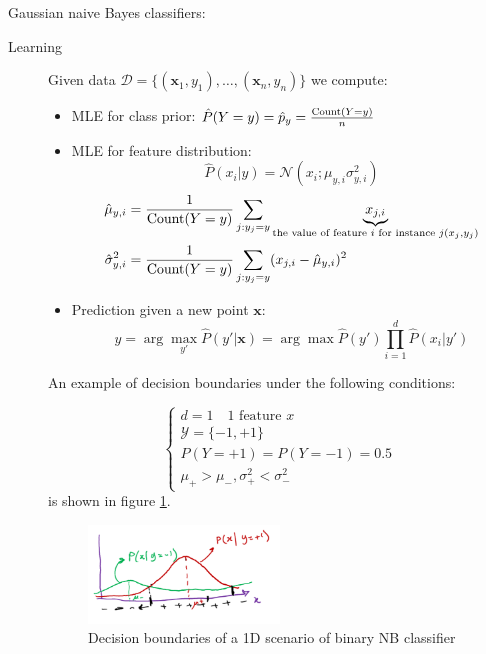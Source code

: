 \documentclass[a4paper,10pt,twoside]{article}
\begin{document}
Gaussian naive Bayes classifiers:
\begin{description}
\item[Learning] Given data $\mathcal{D}=\{(\mathbf{x}_1,y_1),\ldots,(\mathbf{x}_n,y_n)\}$ we compute:
\begin{itemize}
\item MLE for class prior: $\hat{P}(Y=y)=\hat{p}_y={\text{Count}(Y=y)\over n}$
\item MLE for feature distribution:
  \begin{equation*}
    \hat{P}(x_i|y)=\mathcal{N}(x_i;\mu_{y,i}\sigma^2_{y,i})
  \end{equation*}
  \begin{align*}
    \hat{\mu}_{y,i}&={1\over\text{Count}(Y=y)}\sum_{j:y_j=y}\underbrace{x_{j,i}}_{\text{the value of feature }i\text{ for instance } j(x_j,y_j)}\\
    \hat{\sigma}^2_{y,i}&={1\over \text{Count}(Y=y)}\sum_{j:y_j=y}(x_{j,i}-\hat{\mu}_{y,i})^2
  \end{align*}
\item Prediction given a new point $\mathbf{x}$:
  \begin{equation*}
    y=\arg\max_{y'}\hat{P}(y'|\mathbf{x})=\arg\max\hat{P}(y')\prod_{i=1}^{d}\hat{P}(x_i|y')
  \end{equation*}
\end{itemize}
An example of decision boundaries under the following conditions:

\begin{equation*}
  \begin{cases}
    d=1\quad\text{1 feature }x\\
    \mathcal{Y}=\{-1,+1\}\\
    P(Y=+1)=P(Y=-1)=0.5\\
    \mu_+>\mu_-,\sigma_+^2<\sigma_-^2
  \end{cases}
\end{equation*}
is shown in figure \ref{fig:binary_nb_decision_boundary}.

\begin{figure}
  \centering
  \includegraphics[width=0.5\textwidth]{figures/1d_decision_boundaries.png}
  \caption{Decision boundaries of a 1D scenario of binary NB classifier}
  \label{fig:binary_nb_decision_boundary}
\end{figure}

\end{description}
\end{document}
